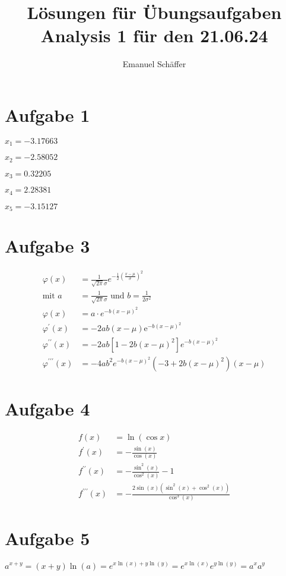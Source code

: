 \documentclass[a4paper, ngerman]{scrartcl}
\begin{document}
	\title{Lösungen für Übungsaufgaben Analysis 1 für den 21.06.24}
	\author{Emanuel Schäffer}
	\maketitle
	\section*{Aufgabe 1}
	\quad $x_1 = -3.17663$
	
	$x_2 = -2.58052$
	
	$x_3 = 0.32205$    
	
	$x_4 = 2.28381$    
	
	$x_5 = -3.15127$    
	
	\section*{Aufgabe 3}
	\begin{align*}
		\varphi(x) &= \frac{1}{\sqrt{2\pi}\sigma}e^{-\frac{1}{2}\left(\frac{x-\mu}{\sigma}\right)^2}\\
		\text{mit }a &= \frac{1}{\sqrt{2\pi}\sigma} \text{ und } b = \frac{1}{2\sigma^2}\\
		\varphi(x) &= a \cdot e^{-b(x-\mu)^2}\\
		\varphi^\prime(x) &= -2ab \left(x - {\mu}\right) \mathrm{e}^{-b \left(x - {\mu}\right)^{2}}\\
		\varphi^{\prime\prime}(x) &= -2ab\left[1-2b(x-\mu)^2\right]e^{-b(x-\mu)^2}\\
		\varphi^{\prime\prime\prime}(x) &= -4 a b^2 e^{-b (x - \mu)^2} (-3 + 2 b (x - \mu)^2) (x - \mu)
	\end{align*}

	\section*{Aufgabe 4}
	\begin{align*}
		f(x) &= \ln(\cos x)\\
		f^\prime(x) &= -\frac{\sin\left(x\right)}{\cos\left(x\right)}\\
		f^{\prime\prime}(x) &= -\frac{\sin^{2}\left(x\right)}{\cos^{2}\left(x\right)} - 1\\
		f^{\prime\prime\prime}(x) &= -\frac{2 \sin\left(x\right) \left(\sin^{2}\left(x\right) + \cos^{2}\left(x\right)\right)}{\cos^{3}\left(x\right)}
	\end{align*}

	\section*{Aufgabe 5}
	\quad $a^{x+y} = (x+y)\ln(a) = e^{x\ln(x)+y\ln(y)} = e^{x\ln(x)} e^{y\ln(y)} = a^xa^y$
	
\end{document}
